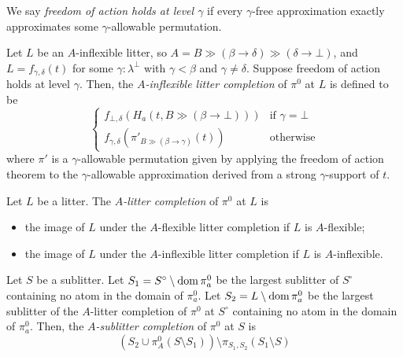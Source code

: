 \documentclass{article}
\begin{document}
\begin{definition}
    We say \emph{freedom of action holds at level \( \gamma \)} if every \( \gamma \)-free approximation exactly approximates some \( \gamma \)-allowable permutation.
\end{definition}
\begin{definition}
    Let \( L \) be an \( A \)-inflexible litter, so \( A = B \gg (\beta \longrightarrow \delta) \gg (\delta \longrightarrow \bot) \), and \( L = f_{\gamma,\delta}(t) \) for some \( \gamma : \lambda^\bot \) with \( \gamma < \beta \) and \( \gamma \neq \delta \).
    Suppose freedom of action holds at level \( \gamma \).
    Then, the \emph{\( A \)-inflexible litter completion} of \( \pi^0 \) at \( L \) is defined to be
    \[ \begin{cases}
        f_{\bot,\delta}(H_a(t, B \gg (\beta \longrightarrow \bot))) & \text{if } \gamma = \bot \\
        f_{\gamma,\delta}(\pi'_{B \gg (\beta \longrightarrow \gamma)}(t)) & \text{otherwise}
    \end{cases} \]
    where \( \pi' \) is a \( \gamma \)-allowable permutation given by applying the freedom of action theorem to the \( \gamma \)-allowable approximation derived from a strong \( \gamma \)-support of \( t \).
\end{definition}
\begin{definition}
    Let \( L \) be a litter.
    The \emph{\( A \)-litter completion} of \( \pi^0 \) at \( L \) is
    \begin{itemize}
        \item the image of \( L \) under the \( A \)-flexible litter completion if \( L \) is \( A \)-flexible;
        \item the image of \( L \) under the \( A \)-inflexible litter completion if \( L \) is \( A \)-inflexible.
    \end{itemize}
\end{definition}
\begin{definition}
    Let \( S \) be a sublitter.
    Let \( S_1 = S^\circ \setminus \operatorname{dom} \pi^0_a \) be the largest sublitter of \( S^\circ \) containing no atom in the domain of \( \pi^0_a \).
    Let \( S_2 = L \setminus \operatorname{dom} \pi^0_a \) be the largest sublitter of the \( A \)-litter completion of \( \pi^0 \) at \( S^\circ \) containing no atom in the domain of \( \pi^0_a \).
    Then, the \emph{\( A \)-sublitter completion} of \( \pi^0 \) at \( S \) is
    \[ (S_2 \cup \pi^0_A(S \setminus S_1)) \setminus \pi_{S_1,S_2}(S_1 \setminus S) \]
\end{definition}
\end{document}
